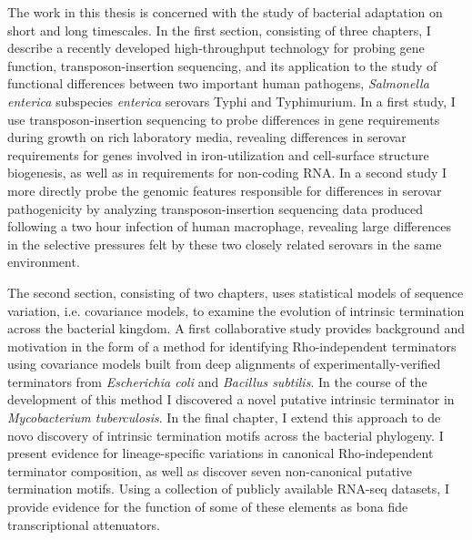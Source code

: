 


\begin{abstracts}        %

The work in this thesis is concerned with the study of bacterial adaptation on short and long timescales. In the first section, consisting of three chapters, I describe a recently developed high-throughput technology for probing gene function, transposon-insertion sequencing, and its application to the study of functional differences between two important human pathogens, \textit{Salmonella enterica} subspecies \textit{enterica} serovars Typhi and Typhimurium. In a first study, I use transposon-insertion sequencing to probe differences in gene requirements during growth on rich laboratory media, revealing differences in serovar requirements for genes involved in iron-utilization and cell-surface structure biogenesis, as well as in requirements for non-coding RNA. In a second study I more directly probe the genomic features responsible for differences in serovar pathogenicity by analyzing transposon-insertion sequencing data produced following a two hour infection of human macrophage, revealing large differences in the selective pressures felt by these two closely related serovars in the same environment.

The second section, consisting of two chapters, uses statistical models of sequence variation, i.e. covariance models, to examine the evolution of intrinsic termination across the bacterial kingdom. A first collaborative study provides background and motivation in the form of a method for identifying Rho-independent terminators using covariance models built from deep alignments of experimentally-verified terminators from \textit{Escherichia coli} and \textit{Bacillus subtilis}. In the course of the development of this method I discovered a novel putative intrinsic terminator in \textit{Mycobacterium tuberculosis}. In the final chapter, I extend this approach to de novo discovery of intrinsic termination motifs across the bacterial phylogeny. I present evidence for lineage-specific variations in canonical Rho-independent terminator composition, as well as discover seven non-canonical putative termination motifs. Using a collection of publicly available RNA-seq datasets, I provide evidence for the function of some of these elements as bona fide transcriptional attenuators.

\end{abstracts}




